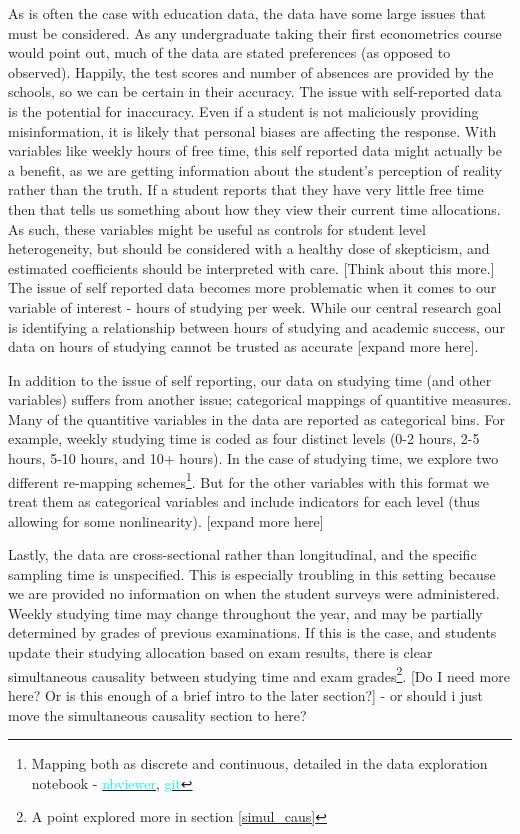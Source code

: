 \documentclass[12pt]{article}
\begin{document}
As is often the case with education data, the data have some large issues that must be considered. As any undergraduate taking their first econometrics course would point out, much of the data are stated preferences (as opposed to observed). Happily, the test scores and number of absences are provided by the schools, so we can be certain in their accuracy. The issue with self-reported data is the potential for inaccuracy. Even if a student is not maliciously providing misinformation, it is likely that personal biases are affecting the response. With variables like weekly hours of free time, this self reported data might actually be a benefit, as we are getting information about the student's perception of reality rather than the truth. If a student reports that they have very little free time then that tells us something about how they view their current time allocations. As such, these variables might be useful as controls for student level heterogeneity, but should be considered with a healthy dose of skepticism, and estimated coefficients should be interpreted with care. \textcolor{BrickRed}{[Think about this more.]} The issue of self reported data becomes more problematic when it comes to our variable of interest - hours of studying per week. While our central research goal is identifying a relationship between hours of studying and academic success, our data on hours of studying cannot be trusted as accurate \textcolor{BrickRed}{[expand more here]}.

In addition to the issue of self reporting, our data on studying time (and other variables) suffers from another issue; categorical mappings of quantitive measures. Many of the quantitive variables in the data are reported as categorical bins. For example, weekly studying time is coded as four distinct levels (0-2 hours, 2-5 hours, 5-10 hours, and 10+ hours). In the case of studying time, we explore two different re-mapping schemes\footnote{Mapping both as discrete and continuous, detailed in the data exploration notebook - \href{https://nbviewer.jupyter.org/github/nadavtadelis/Reproducible_Metrics/blob/master/data_exploration.ipynb}{\textcolor{cyan}{nbviewer}}, \href{https://github.com/nadavtadelis/Reproducible_Metrics/blob/master/data_exploration.ipynb}{\textcolor{cyan}{git}}}. But for the other variables with this format we treat them as categorical variables and include indicators for each level (thus allowing for some nonlinearity).
\textcolor{BrickRed}{[expand more here]}

Lastly, the data are cross-sectional rather than longitudinal, and the specific sampling time is unspecified. This is especially troubling in this setting because we are provided no information on when the student surveys were administered. Weekly studying time may change throughout the year, and may be partially determined by grades of previous examinations. If this is the case, and students update their studying allocation based on exam results, there is clear simultaneous causality between studying time and exam grades\footnote{A point explored more in section \ref{simul_caus}}. 
\textcolor{BrickRed}{[Do I need more here? Or is this enough of a brief intro to the later section?] - or should i just move the simultaneous causality section to here?}
\end{document}
